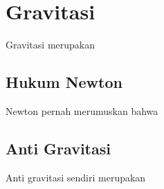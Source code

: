 \section{Gravitasi}
\vspace{1ex}

Gravitasi merupakan \lipsum[1]
\vspace{0.5ex}

\subsection{Hukum Newton}
\vspace{1ex}

Newton pernah merumuskan \citep{newtonLaw} bahwa \lipsum[2]
\vspace{0.5ex}

\subsection{Anti Gravitasi}
\vspace{1ex}

Anti gravitasi sendiri merupakan \lipsum[3]
\vspace{0.5ex}
